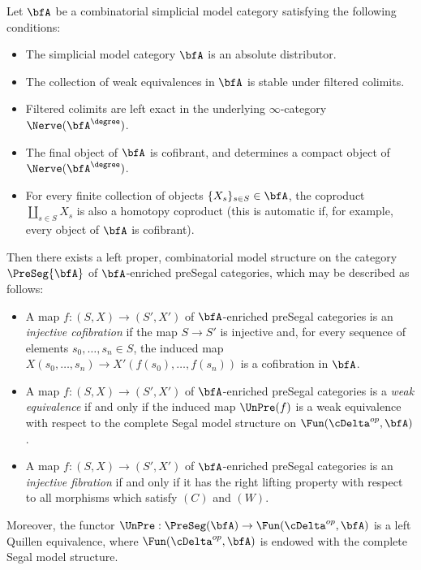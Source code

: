 \begin{proposition}\label{curt}
Let $\bfA$ be a combinatorial simplicial model category satisfying the following conditions:
\begin{itemize}
\item[$(a)$] The simplicial model category $\bfA$ is an absolute distributor.
\item[$(b)$] The collection of weak equivalences in $\bfA$ is stable under filtered colimits.
\item[$(c)$] Filtered colimits are left exact in the underlying $\infty$-category $\Nerve( \bfA^{\degree})$.
\item[$(d)$] The final object of $\bfA$ is cofibrant, and determines a compact object
of $\Nerve( \bfA^{\degree})$. 
\item[$(e)$] For every finite collection of objects $\{ X_s \}_{s \in S} \in \bfA$, the
coproduct $\coprod_{s \in S} X_s$ is also a homotopy coproduct
(this is automatic if, for example, every object of $\bfA$ is cofibrant).
\end{itemize}

Then there exists a left proper, combinatorial model structure on the category $\PreSeg{\bfA}$ of $\bfA$-enriched preSegal categories, which may be described as follows:
\begin{itemize}
\item[$(C)$] A map $f: (S, X) \rightarrow (S', X')$ of $\bfA$-enriched preSegal
categories is an {\it injective cofibration} if the map $S \rightarrow S'$
is injective and, for every sequence of elements $s_0, \ldots, s_n \in S$, the induced map
$X( s_0, \ldots, s_n) \rightarrow X'( f(s_0), \ldots, f(s_n) )$ is a cofibration in $\bfA$.

\item[$(W)$] A map $f: (S,X) \rightarrow (S',X')$ of $\bfA$-enriched 
preSegal categories is a {\it weak equivalence} if and only if the induced map
$\UnPre(f)$ is a weak equivalence with respect to the complete Segal model structure
on $\Fun( \cDelta^{op}, \bfA)$.

\item[$(F)$] A map $f: (S,X) \rightarrow (S',X')$ of $\bfA$-enriched preSegal categories
is an {\it injective fibration} if and only if it has the right lifting property with respect to
all morphisms which satisfy $(C)$ and $(W)$.
\end{itemize}

Moreover, the functor $\UnPre: \PreSeg(\bfA) \rightarrow \Fun( \cDelta^{op}, \bfA)$
is a left Quillen equivalence, where $\Fun( \cDelta^{op}, \bfA)$ is endowed with
the complete Segal model structure.
\end{proposition}

